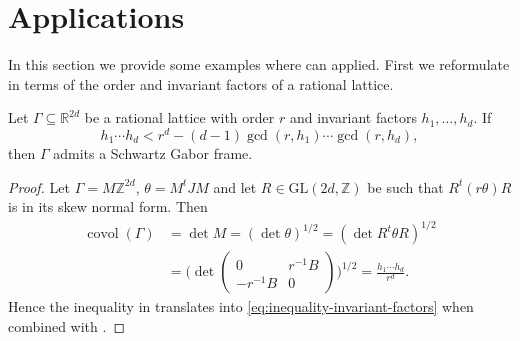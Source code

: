 \documentclass[reqno, a4paper]{amsart}
\numberwithin{equation}{section}
\newcommand{\Z}{\mathbb{Z}}   %
\newcommand{\R}{\mathbb{R}}   %
\DeclareMathOperator{\covol}{covol}
\begin{document}
\section{Applications}

In this section we provide some examples where  can applied. First we reformulate  in terms of the order and invariant factors of a rational lattice.

\begin{proposition}
\label{prop:condition-invariant-factors}
Let $\Gamma \subseteq \R^{2d}$ be a rational lattice with order $r$ and invariant factors $h_1, \ldots, h_d$. 
If
\begin{equation}
    h_1 \cdots h_d < r^d - (d-1) \gcd(r,h_1) \cdots \gcd(r,h_d), \label{eq:inequality-invariant-factors}
\end{equation}
then $\Gamma$ admits a Schwartz Gabor frame.
\end{proposition}

\begin{proof}
Let $\Gamma = M \Z^{2d}$, $\theta = M^t J M$ and let $R \in \mathrm{GL}(2d,\Z)$ be such that $R^t(r\theta)R$ is in its skew normal form. Then
\begin{align*}
\covol(\Gamma) 
&= \det M = (\det \theta)^{1/2} = ( \det R^t \theta R)^{1/2} \\
&= \Big( \det \begin{pmatrix} 0 & r^{-1}B \\ -r^{-1}B & 0 \end{pmatrix} \Big)^{1/2} = \frac{h_1 \cdots h_d}{r^d}. 
\end{align*}
Hence the inequality in  translates into \eqref{eq:inequality-invariant-factors} when combined with .
\end{proof}
\end{document}
